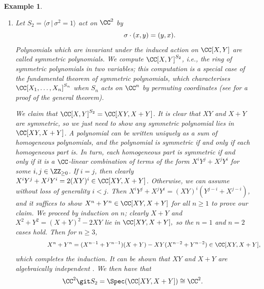 \documentclass[12pt]{amsart}
\theoremstyle{plain}
\newtheorem{example}[theorem]{Example}
\begin{document}
\begin{example}
\begin{enumerate}
\item
Let $S_2 = \langle \sigma \, | \, \sigma^2 = 1 \rangle$ act on $\CC^2$ by
$$
\hspace{\labelwidth} \hspace{\labelsep} \hspace{\leftmargin}
\sigma \cdot (x, y) = (y, x).
$$
Polynomials which are invariant under the induced action on $\CC[X, Y]$ are called symmetric polynomials.
We compute $\CC[X, Y]^{S_2}$, i.e., the ring of symmetric polynomials in two variables;
this computation is a special case of the fundamental theorem of symmetric polynomials, which characterises $\CC[X_1, \ldots, X_n]^{S_n}$ when $S_n$ acts on $\CC^n$ by permuting coordinates (see \cite[Chapter IV, \S 6]{Lang02} for a proof of the general theorem).

We claim that $\CC[X,Y]^{S_2} = \CC[XY, X+Y]$.
It is clear that $XY$ and $X+Y$ are symmetric, so we just need to show any symmetric polynomial lies in $\CC[XY, X+Y]$.
A polynomial can be written uniquely as a sum of homogeneous polynomials, and the polynomial is symmetric if and only if each homogeneous part is.
In turn, each homogeneous part is symmetric if and only if it is a $\CC$-linear combination of terms of the form $X^i Y^j + X^j Y^i$ for some $i, j \in \ZZ_{\ge 0}$.
If $i = j$, then clearly $X^i Y^j + X^j Y^i = 2 (XY)^i \in \CC[XY, X+Y]$.
Otherwise, we can assume without loss of generality $i < j$.
Then $X^i Y^j + X^j Y^i = (XY)^{i} (Y^{j-i} + X^{j-i})$, and it suffices to show $X^n + Y^n \in \CC[XY, X+Y]$ for all $n \ge 1$ to prove our claim.
We proceed by induction on $n$; clearly $X+Y$ and $X^2 + Y^2 = (X+Y)^2 - 2 XY$ lie in $\CC[XY, X+Y],$ so the $n=1$ and $n=2$ cases hold.
Then for $n \ge 3$,
$$
\hspace{\labelwidth} \hspace{\labelsep} \hspace{\leftmargin}
X^n + Y^n = (X^{n-1} + Y^{n-1})(X+Y) - XY (X^{n-2} + Y^{n-2}) \in \CC[XY, X+Y],
$$
which completes the induction.
It can be shown that $XY$ and $X+Y$ are algebraically independent \cite[Chapter IV, \S 6]{Lang02}.
We then have that
$$\CC^2 \git S_2= \Spec(\CC[XY, X+Y]) \cong \CC^2.$$


\end{enumerate}
\end{example}
\end{document}
